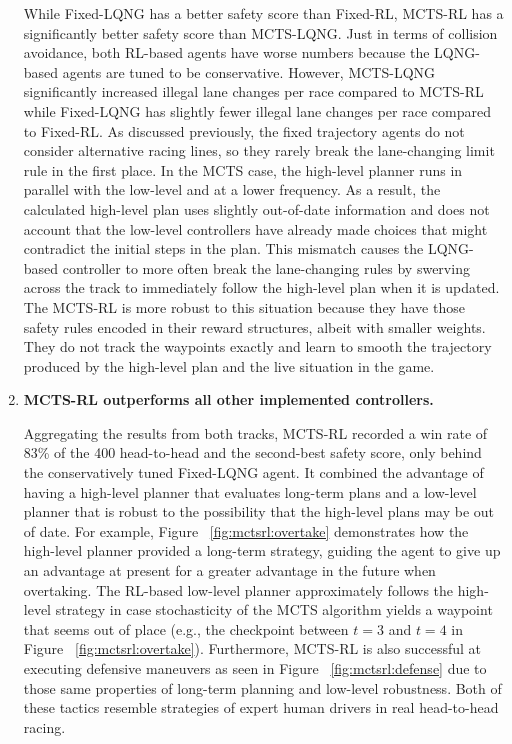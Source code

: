 \begin{enumerate}[wide, labelindent=0pt, font=\bfseries]
While Fixed-LQNG has a better safety score than Fixed-RL, MCTS-RL has a significantly better safety score than MCTS-LQNG. Just in terms of collision avoidance, both RL-based agents have worse numbers because the LQNG-based agents are tuned to be conservative. However, MCTS-LQNG significantly increased illegal lane changes per race compared to MCTS-RL while Fixed-LQNG has slightly fewer illegal lane changes per race compared to Fixed-RL. As discussed previously, the fixed trajectory agents do not consider alternative racing lines, so they rarely break the lane-changing limit rule in the first place. In the MCTS case, the high-level planner runs in parallel with the low-level and at a lower frequency. As a result, the calculated high-level plan uses slightly out-of-date information and does not account that the low-level controllers have already made choices that might contradict the initial steps in the plan. This mismatch causes the LQNG-based controller to more often break the lane-changing rules by swerving across the track to immediately follow the high-level plan when it is updated. The MCTS-RL is more robust to this situation because they have those safety rules encoded in their reward structures, albeit with smaller weights. They do not track the waypoints exactly and learn to smooth the trajectory produced by the high-level plan and the live situation in the game.

\item \textbf{MCTS-RL outperforms all other implemented controllers.}  

 Aggregating the results from both tracks, MCTS-RL recorded a win rate of 83\% of the 400 head-to-head and the second-best safety score, only behind the conservatively tuned Fixed-LQNG agent. It combined the advantage of having a high-level planner that evaluates long-term plans and a low-level planner that is robust to the possibility that the high-level plans may be out of date. For example, Figure~ \ref{fig:mctsrl:overtake} demonstrates how the high-level planner provided a long-term strategy, guiding the agent to give up an advantage at present for a greater advantage in the future when overtaking. The RL-based low-level planner approximately follows the high-level strategy in case stochasticity of the MCTS algorithm yields a waypoint that seems out of place (e.g., the checkpoint between $t=3$ and $t=4$ in Figure~ \ref{fig:mctsrl:overtake}). Furthermore, MCTS-RL is also successful at executing defensive maneuvers as seen in Figure~ \ref{fig:mctsrl:defense} due to those same properties of long-term planning and low-level robustness. Both of these tactics resemble strategies of expert human drivers in real head-to-head racing.
 \end{enumerate}

